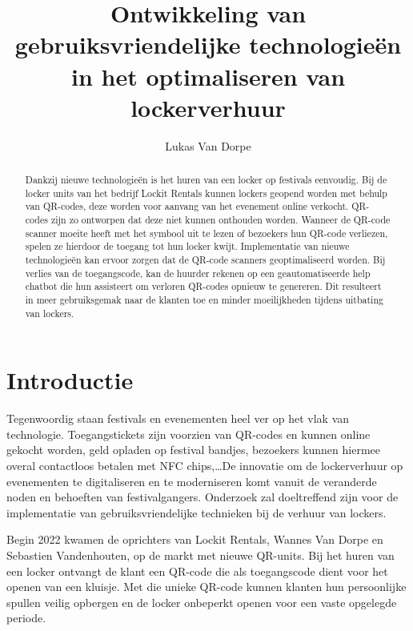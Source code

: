 \documentclass{hogent-article}
\title{Ontwikkeling van gebruiksvriendelijke technologieën in het optimaliseren van lockerverhuur}
\author{Lukas Van Dorpe}
\begin{document}
\begin{abstract}
  Dankzij nieuwe technologieën is het huren van een locker op festivals eenvoudig. Bij de locker units van het bedrijf Lockit Rentals kunnen lockers geopend worden met behulp van QR-codes, deze worden voor aanvang van het evenement online verkocht. QR-codes zijn zo ontworpen dat deze niet kunnen onthouden worden. Wanneer de QR-code scanner moeite heeft met het symbool uit te lezen of bezoekers hun QR-code verliezen, spelen ze hierdoor de toegang tot hun locker kwijt. Implementatie van nieuwe technologieën kan ervoor zorgen dat de QR-code scanners geoptimaliseerd worden. Bij verlies van de toegangscode, kan de huurder rekenen op een geautomatiseerde help chatbot die hun assisteert om verloren QR-codes opnieuw te genereren. Dit resulteert in meer gebruiksgemak naar de klanten toe en minder moeilijkheden tijdens uitbating van lockers.
  
\end{abstract}

\tableofcontents

% 


\section{Introductie}%
\label{sec:introductie}

Tegenwoordig staan festivals en evenementen heel ver op het vlak van technologie. Toegangstickets zijn voorzien van QR-codes en kunnen online gekocht worden, geld opladen op festival bandjes, bezoekers kunnen hiermee overal contactloos betalen met NFC chips,\dots De innovatie om de lockerverhuur op evenementen te digitaliseren en te moderniseren komt vanuit de veranderde noden en behoeften van festivalgangers. Onderzoek zal doeltreffend zijn voor de implementatie van gebruiksvriendelijke technieken bij de verhuur van lockers.

Begin 2022 kwamen de oprichters van Lockit Rentals, Wannes Van Dorpe en Sebastien Vandenhouten, op de markt met nieuwe QR-units. Bij het huren van een locker ontvangt de klant een QR-code die als toegangscode dient voor het openen van een kluisje. Met die unieke QR-code kunnen klanten hun persoonlijke spullen veilig opbergen en de locker onbeperkt openen voor een vaste opgelegde periode. 
\end{document}
